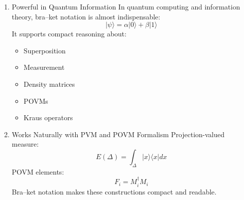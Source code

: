 \documentclass[12pt]{article}
\begin{document}
\begin{enumerate}
Simplifies Tensor Products
Composite systems are naturally written:
\[|\psi\rangle \otimes |\phi\rangle\]
Entangled states appear transparently:
\[|\Psi\rangle = \sum_{ij} c_{ij} |i\rangle \otimes |j\rangle\]
\item
Powerful in Quantum Information
In quantum computing and information theory, bra--ket notation is almost
indispensable:
\[|\psi\rangle = \alpha|0\rangle + \beta|1\rangle\]
It supports compact reasoning about:
\begin{itemize}
\item
  Superposition
\item
  Measurement
\item
  Density matrices
\item
  POVMs
\item
  Kraus operators
\end{itemize}
\item
Works Naturally with PVM and POVM Formalism
Projection-valued measure:
\[E(\Delta) = \int_\Delta |x\rangle\langle x| dx\]
POVM elements:
\[F_i = M_i^\dagger M_i\]
Bra--ket notation makes these constructions compact and readable.
\end{enumerate}
\end{document}
